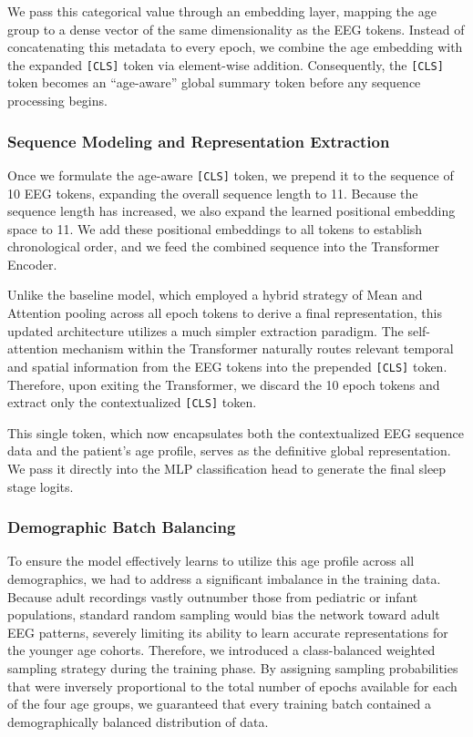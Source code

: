 We pass this categorical value through an embedding layer, mapping the age group to a dense vector of the same dimensionality as the EEG tokens. 
Instead of concatenating this metadata to every epoch, we combine the age embedding with the expanded \texttt{[CLS]} token via element-wise addition. Consequently, the \texttt{[CLS]} token becomes an ``age-aware'' global summary token before any sequence processing begins.

\subsubsection*{Sequence Modeling and Representation Extraction}
Once we formulate the age-aware \texttt{[CLS]} token, we prepend it to the sequence of 10 EEG tokens, expanding the overall sequence length to 11. Because the sequence length has increased, we also expand the learned positional embedding space to 11. We add these positional embeddings to all tokens to establish chronological order, and we feed the combined sequence into the Transformer Encoder.

Unlike the baseline model, which employed a hybrid strategy of Mean and Attention pooling across all epoch tokens to derive a final representation, this updated architecture utilizes a much simpler extraction paradigm. The self-attention mechanism within the Transformer naturally routes relevant temporal and spatial information from the EEG tokens into the prepended \texttt{[CLS]} token. Therefore, upon exiting the Transformer, we discard the 10 epoch tokens and extract only the contextualized \texttt{[CLS]} token.

This single token, which now encapsulates both the contextualized EEG sequence data and the patient's age profile, serves as the definitive global representation. We pass it directly into the MLP classification head to generate the final sleep stage logits.
\subsubsection*{Demographic Batch Balancing}
To ensure the model effectively learns to utilize this age profile across all demographics, we had to address a significant imbalance in the training data. Because adult recordings vastly outnumber those from pediatric or infant populations, standard random sampling would bias the network toward adult EEG patterns, severely limiting its ability to learn accurate representations for the younger age cohorts. Therefore, we introduced a class-balanced weighted sampling strategy during the training phase. By assigning sampling probabilities that were inversely proportional to the total number of epochs available for each of the four age groups, we guaranteed that every training batch contained a demographically balanced distribution of data.

